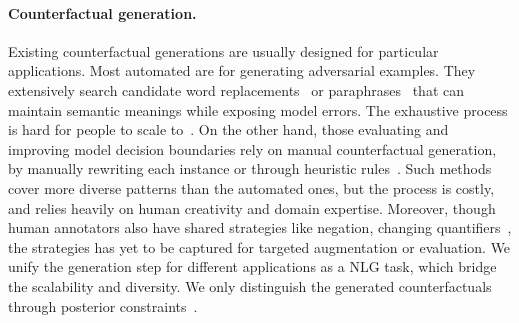 \paragraph{Counterfactual generation.}
Existing counterfactual generations are usually designed for particular applications.
Most automated are for generating adversarial examples. 
They extensively search candidate word replacements~\cite{alzantot2018generating, garg2020bae, alzantot2018generating, andreas2019good} or paraphrases~\cite{iyyer2018adversarial, malandrakis-etal-2019-controlled} that can maintain semantic meanings while exposing model errors.
The exhaustive process is hard for people to scale to~\cite{ribeiro2018sear}.
On the other hand, those evaluating and improving model decision boundaries rely on manual counterfactual generation, by manually rewriting each instance or through heuristic rules~\cite{Geiger2019PosingFG, li2020linguistically, jiang2019avoiding}.
Such methods cover more diverse patterns than the automated ones, but the process is costly, and relies heavily on human creativity and domain expertise.
Moreover, though human annotators also have shared strategies like negation, changing quantifiers~\cite{kaushik2019learning, gardner2020contrast}, the strategies has yet to be  captured for targeted augmentation or evaluation.
We unify the generation step for different applications as a NLG task, which bridge the scalability and diversity.
We only distinguish the generated counterfactuals through posterior constraints~\cite{morris2020textattack, alzantot-etal-2018-generating}.














